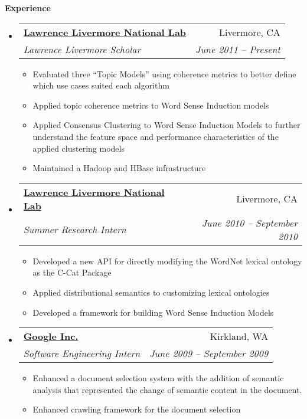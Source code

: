 \documentclass[letterpaper,11pt]{article}
\makeatletter
\newcommand{\resitem}[1]{\item #1 \vspace{-2pt}}
\newcommand{\resheading}[1]{{\large \colorbox{mygrey}{\begin{minipage}{\textwidth}{\textbf{#1 \vphantom{p\^{E}}}}\end{minipage}}}}
\newcommand{\ressubheading}[4]{
\begin{tabular*}{6.5in}{l@{\extracolsep{\fill}}r}
		\textbf{#1} & #2 \\
		\textit{#3} & \textit{#4} \\
\end{tabular*}\vspace{-6pt}}
\makeatother
\begin{document}
\resheading{Experience}
  \begin{itemize}
    \item \ressubheading{\href{http://www.llnl.gov}
                              {Lawrence Livermore National Lab}}
                        {Livermore, CA}
                        {Lawrence Livermore Scholar}
                        {June 2011 -- Present}
          { \footnotesize
            \begin{itemize}
              \resitem{Evaluated three ``Topic Models'' using coherence metrics
                       to better define which use cases suited each algorithm}
              \resitem{Applied topic coherence metrics to Word Sense Induction
                       models}
              \resitem{Applied Consensus Clustering to Word Sense Induction Models
                       to further understand the feature space and performance
                       characteristics of the applied clustering models}
              \resitem{Maintained a Hadoop and HBase infrastructure}
            \end{itemize}
          }
    \item \ressubheading{\href{http://www.llnl.gov}
                              {Lawrence Livermore National Lab}}
                        {Livermore, CA}
                        {Summer Research Intern}
                        {June 2010 -- September 2010}
          { \footnotesize
            \begin{itemize}
              \resitem{Developed a new API for directly modifying the WordNet
                       lexical ontology as the C-Cat Package}
              \resitem{Applied distributional semantics to customizing lexical
                       ontologies}
              \resitem{Developed a framework for building Word Sense Induction
                       Models}
            \end{itemize}
          }
    \item \ressubheading{\href{http://www.Google.com}
                              {Google Inc.}}
                        {Kirkland, WA}
                        {Software Engineering Intern}
                        {June 2009 -- September 2009}
          { \footnotesize
            \begin{itemize}
              \resitem{Enhanced a document selection system with the addition of
                       semantic analysis that represented the change of semantic
                       content in the document.}
              \resitem{Enhanced crawling framework for the document selection
}
\end{itemize}}
\end{itemize}
\end{document}
